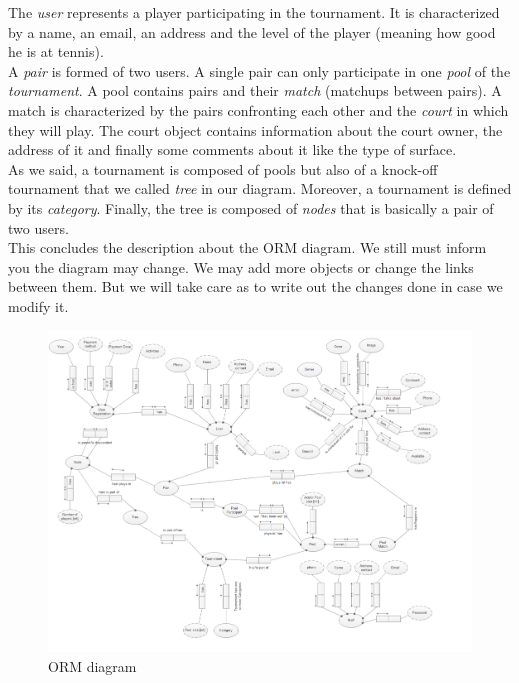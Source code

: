 \documentclass[a4paper, 12pt]{article}
\begin{document}
 The \textit{user} represents a player participating in the tournament. It is characterized by a name, an email, an address and the level of the player (meaning how good he is at tennis). \\
 
 A \textit{pair} is formed of two users. A single pair can only participate in one \textit{pool} of the \textit{tournament}. A pool contains pairs and their \textit{match} (matchups between pairs). A match is characterized by the pairs confronting each other and the \textit{court} in which they will play. The court object contains information about the court owner, the address of it and finally some comments about it like the type of surface. \\
 
 As we said, a tournament is composed of pools but also of a knock-off tournament that we called \textit{tree} in our diagram. Moreover, a tournament is defined by its \textit{category}. Finally, the tree is composed of \textit{nodes} that is basically a pair of two users. \\
 
 This concludes the description about the ORM diagram. We still must inform you the diagram may change. We may add more objects or change the links between them. But we will take care as to write out the changes done in case we modify it.
 
\begin{figure}
	\caption{ORM diagram}
	\label{ORM_diagram}
	\includegraphics[scale=0.5, angle=270]{ORMfinal.png}

\end{figure}
\end{document}
